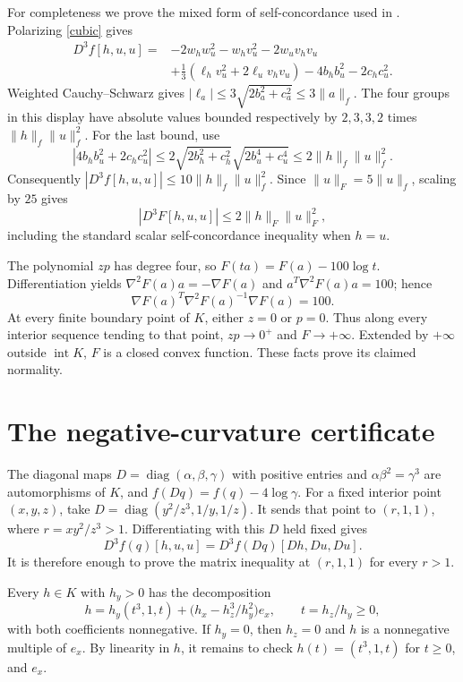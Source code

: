 \documentclass[11pt]{article}
\newcommand{\inter}{\operatorname{int}}
\newcommand{\diag}{\operatorname{diag}}
\begin{document}
For completeness we prove the mixed form of self-concordance used in
\cite[Section~2.2]{DTV}. Polarizing \eqref{cubic} gives
\begin{align*}
 D^3f[h,u,u]={}&-2w_hw_u^2-w_hv_u^2-2w_uv_hv_u\\
 &+\tfrac13(\ell_hv_u^2+2\ell_uv_hv_u)-4b_hb_u^2-2c_hc_u^2.
\end{align*}
Weighted Cauchy--Schwarz gives $|\ell_a|\leq3\sqrt{2b_a^2+c_a^2}
\leq3\|a\|_f$. The four groups in this display have absolute values
bounded respectively by $2,3,3,2$ times $\|h\|_f\|u\|_f^2$.
For the last bound, use
\[
 |4b_hb_u^2+2c_hc_u^2|
 \leq2\sqrt{2b_h^2+c_h^2}\sqrt{2b_u^4+c_u^4}
 \leq2\|h\|_f\|u\|_f^2.
\]
Consequently $|D^3f[h,u,u]|\leq10\|h\|_f\|u\|_f^2$. Since
$\|u\|_F=5\|u\|_f$, scaling by $25$ gives
\[
 |D^3F[h,u,u]|\leq2\|h\|_F\|u\|_F^2,
\]
including the standard scalar self-concordance inequality when $h=u$.

The polynomial $zp$ has degree four, so
$F(ta)=F(a)-100\log t$. Differentiation yields
$\nabla^2F(a)a=-\nabla F(a)$ and $a^T\nabla^2F(a)a=100$; hence
\[
 \nabla F(a)^T\nabla^2F(a)^{-1}\nabla F(a)=100.
\]
At every finite boundary point of $K$, either $z=0$ or $p=0$.
Thus along every interior sequence tending to that point, $zp\to0^+$
and $F\to+\infty$. Extended by $+\infty$ outside $\inter K$, $F$ is a
closed convex function. These facts prove its claimed normality.

\section{The negative-curvature certificate}
The diagonal maps $D=\diag(\alpha,\beta,\gamma)$ with positive entries
and $\alpha\beta^2=\gamma^3$ are automorphisms of $K$, and
$f(Dq)=f(q)-4\log\gamma$. For a fixed interior point $(x,y,z)$, take
$D=\diag(y^2/z^3,1/y,1/z)$. It sends that point to $(r,1,1)$,
where $r=xy^2/z^3>1$. Differentiating with this $D$ held fixed gives
\[
 D^3f(q)[h,u,u]=D^3f(Dq)[Dh,Du,Du].
\]
It is therefore enough to prove the matrix inequality at $(r,1,1)$
for every $r>1$.

Every $h\in K$ with $h_y>0$ has the decomposition
\[
 h=h_y(t^3,1,t)+\bigl(h_x-h_z^3/h_y^2\bigr)e_x,\qquad t=h_z/h_y\geq0,
\]
with both coefficients nonnegative. If $h_y=0$, then $h_z=0$ and $h$
is a nonnegative multiple of $e_x$. By linearity in $h$, it remains to
check $h(t)=(t^3,1,t)$ for $t\geq0$, and $e_x$.
\end{document}
